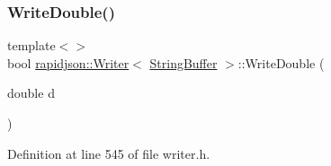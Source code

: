 \subsubsection{\texorpdfstring{WriteDouble()}{WriteDouble()}\hspace{0.1cm}{\footnotesize\ttfamily [2/2]}}
{\footnotesize\ttfamily template$<$$>$ \\
bool \mbox{\hyperlink{classrapidjson_1_1_writer}{rapidjson\+::\+Writer}}$<$ \mbox{\hyperlink{namespacerapidjson_ac0765ea91f41539645c4b78689d03f21}{String\+Buffer}} $>$\+::Write\+Double (\begin{DoxyParamCaption}\item[{double}]{d }\end{DoxyParamCaption})\hspace{0.3cm}{\ttfamily [protected]}}



Definition at line 545 of file writer.\+h.


